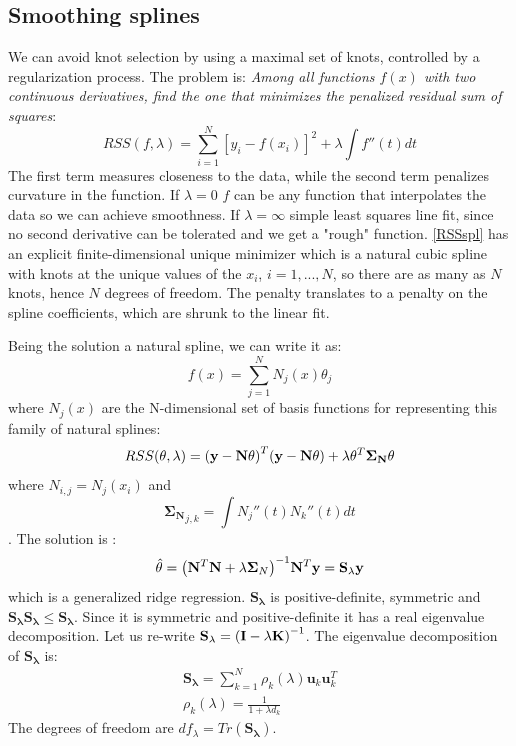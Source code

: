\documentclass[12pt, letterpaper]{article}
\theoremstyle{definition}
\newcommand{\I}{\mathrm{\mathbf{I}}}
\newcommand{\y}{\mathbf{y}}
\DeclarePairedDelimiter\autobracket{(}{)}
\newcommand{\br}[1]{\autobracket*{#1}}
\begin{document}
\subsection{Smoothing splines}
We can avoid knot selection by using a maximal set of knots, controlled by a regularization process. The problem is: \textit{Among all functions $f(x)$ with two continuous derivatives, find the one that minimizes the penalized residual sum of squares}:
\begin{equation}
RSS(f,\lambda) = \sum_{i=1}^N \left[y_i - f(x_i)\right]^2 + \lambda \int f''(t) dt
\label{RSSspl}
\end{equation}
The first term measures closeness to the data, while the second term penalizes curvature in the function. If $\lambda=0$ $f$ can be any function that interpolates the data so we can achieve smoothness. If $\lambda=\infty$ simple least squares line fit, since no second derivative can be tolerated and we get a "rough" function.
\autoref{RSSspl} has an explicit finite-dimensional unique minimizer which is a natural cubic spline with knots at the unique values of the $x_i$, $i = 1,...,N$, so there are as many as $N$ knots, hence $N$ degrees of freedom. The penalty translates to a penalty on the spline coefficients, which are shrunk to the linear fit.

Being the solution a natural spline, we can write it as:
\begin{equation}
f(x) = \sum_{j=1}^N N_j(x)\theta_j
\end{equation}
where $N_j(x)$ are the N-dimensional set of basis functions for representing this family of natural splines:
\begin{equation}
RSS(\theta, \lambda) = \br{\y - \mathbf{N}\theta}^T\br{\y - \mathbf{N}\theta}+\lambda \theta^T\mathbf{\Sigma_N}\theta
\end{equation}
where ${N}_{i,j} = N_j(x_i)$ and $${\mathbf{\Sigma_N}}_{j,k} = \int N_j''(t)N_k''(t)dt$$. The solution is :
\begin{equation}
\hat{\theta} = \br{\mathbf{N}^T\mathbf{N}+\lambda\mathbf{\Sigma}_N}^{-1}\mathbf{N}^T\y = \mathbf{S_\lambda} \y
\end{equation}
which is a generalized ridge regression. $\mathbf{S_\lambda}$ is positive-definite, symmetric and $\mathbf{S_\lambda}\mathbf{S_\lambda} \le \mathbf{S_\lambda}$. Since it is symmetric and positive-definite it has a real eigenvalue decomposition. Let us re-write $\mathbf{S_\lambda} = \br{\I-\lambda \mathbf{K}}^{-1}$.
The eigenvalue decomposition of $\mathbf{S_\lambda}$ is:
\begin{equation}
\begin{aligned}
\mathbf{S_\lambda} = \sum_{k=1}^N \rho_k(\lambda)\mathbf{u}_k\mathbf{u}_k^T\\
\rho_k(\lambda) = \frac{1}{1+\lambda d_k}
\end{aligned}
\end{equation}
The degrees of freedom are $df_\lambda = Tr(\mathbf{S_\lambda})$.
\end{document}
